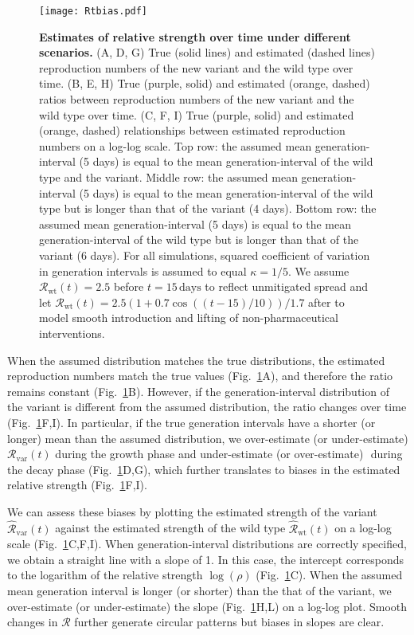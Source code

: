 \documentclass[12pt]{article}
\newcommand{\fref}[1]{Fig.~\ref{fig:#1}}
\newcommand{\vvvar}{\mathrm{var}}
\newcommand{\wwwt}{\mathrm{wt}}
\newcommand{\Rx}[1]{\ensuremath{{\mathcal R}_{#1}}\xspace}
\newcommand{\RR}{\ensuremath{{\mathcal R}}\xspace}
\newcommand{\Rw}{\Rx{\wwwt}}
\newcommand{\Rv}{\Rx{\vvvar}}
\begin{document}
\begin{figure}[!th]
\texttt{[image: Rtbias.pdf]}
\caption{
\textbf{Estimates of relative strength over time under different scenarios.}
(A, D, G) True (solid lines) and estimated (dashed lines) reproduction numbers of the new variant and the wild type over time.
(B, E, H) True (purple, solid) and estimated (orange, dashed) ratios between reproduction numbers of the new variant and the wild type over time.
(C, F, I) True (purple, solid) and estimated (orange, dashed) relationships between estimated reproduction numbers on a log-log scale.
Top row: the assumed mean generation-interval (5 days) is equal to the mean generation-interval of the wild type and the variant.
Middle row: the assumed mean generation-interval (5 days) is equal to the mean generation-interval of the wild type but is longer than that of the variant (4 days).
Bottom row: the assumed mean generation-interval (5 days) is equal to the mean generation-interval of the wild type but is longer than that of the variant (6 days).
For all simulations, squared coefficient of variation in generation intervals is assumed to equal $\kappa = 1/5$.
We assume $\Rw(t)=2.5$ before $t=15\,\textrm{days}$ to reflect unmitigated spread and let $\Rw(t)=2.5 (1+0.7\cos((t-15)/10))/1.7$ after to model smooth introduction and lifting of non-pharmaceutical interventions.
}
\label{fig:Rtbias}
\end{figure}

When the assumed distribution matches the true distributions, the estimated reproduction numbers match the true values (\fref{Rtbias}A), and therefore the ratio remains constant (\fref{Rtbias}B).
However, if the generation-interval distribution of the variant is different from the assumed distribution, the ratio changes over time (\fref{Rtbias}F,I).
In particular, if the true generation intervals have a shorter (or longer) mean than the assumed distribution, we over-estimate (or under-estimate) $\Rv(t)$ during the growth phase and under-estimate (or over-estimate) $ $ during the decay phase (\fref{Rtbias}D,G), which further translates to biases in the estimated relative strength (\fref{Rtbias}F,I).

We can assess these biases by plotting the estimated strength of the variant $\hat{\RR}_{\textrm{var}}(t)$ against the estimated strength of the wild type $\hat{\RR}_{\textrm{wt}}(t)$ on a log-log scale (\fref{Rtbias}C,F,I).
When generation-interval distributions are correctly specified, we obtain a straight line with a slope of 1. 
In this case, the intercept corresponds to the logarithm of the relative strength $\log(\rho)$ (\fref{Rtbias}C).
When the assumed mean generation interval is longer (or shorter) than the that of the variant, we over-estimate (or under-estimate) the slope (\fref{Rtbias}H,L) on a log-log plot.
Smooth changes in $\RR$ further generate circular patterns but biases in slopes are clear.
\end{document}
